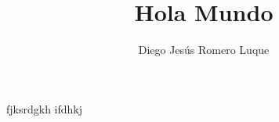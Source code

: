 \documentclass{article}
\title{Hola Mundo}
\author{Diego Jesús Romero Luque}
\begin{document}

\maketitle
\pagebreak
fjksrdgkh
ifdhkj
\end{document}

